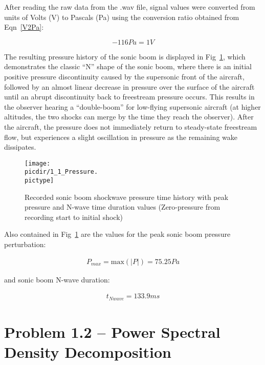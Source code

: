 \documentclass[twocolumn,10pt]{asme2ej}
\begin{document}
After reading the raw data from the .wav file, signal values were converted from units of Volts (V) to Pascals (Pa) using the conversion ratio obtained from Eqn~\ref{V2Pa}:

\begin{equation} \label{V2Pa}
-116Pa = 1V
\end{equation}

The resulting pressure history of the sonic boom is displayed in Fig~\ref{boom}, which demonstrates the classic ``N'' shape of the sonic boom, where there is an initial positive pressure discontinuity caused by the supersonic front of the aircraft, followed by an almost linear decrease in pressure over the surface of the aircraft until an abrupt discontinuity back to freestream pressure occurs.  This results in the observer hearing a ``double-boom'' for low-flying supersonic aircraft (at higher altitudes, the two shocks can merge by the time they reach the observer).  After the aircraft, the pressure does not immediately return to steady-state freestream flow, but experiences a slight oscillation in pressure as the remaining wake dissipates.

\begin{figure}[htb]
\begin{center}
\texttt{[image: \\picdir/1\_1\_Pressure.\\pictype]}
\caption{Recorded sonic boom shockwave pressure time history with peak pressure and N-wave time duration values (Zero-pressure from recording start to initial shock)}
\label{boom}
\end{center}
\end{figure}

Also contained in Fig~\ref{boom} are the values for the peak sonic boom pressure perturbation:

\begin{gather*}
P_{max}=\text{max}\left(|P|\right)=\boxed{75.25Pa}
\end{gather*}

\noindent and sonic boom N-wave duration:

\begin{gather*}
t_{Nwave}=\boxed{133.9ms}
\end{gather*}



\section{Problem 1.2 -- Power Spectral Density Decomposition}
\end{document}
